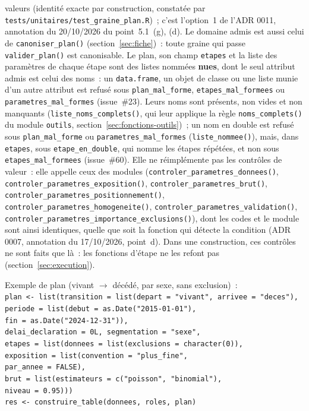\documentclass[a4paper,11pt]{article}
\newcommand{\code}[1]{\texttt{\small #1}}
\begin{document}
{valeurs (identité exacte par construction, constatée par
\code{tests/unitaires/test\_graine\_plan.R})~; c'est l'option~1 de l'ADR
0011, annotation du 20/10/2026 du point~5.1~(g), (d). Le domaine admis est
aussi celui de \code{canoniser\_plan()} (section~\ref{sec:fiche})~: toute
graine qui passe \code{valider\_plan()} est canonisable.
Le plan, son champ \code{etapes} et la liste des paramètres de chaque étape
sont des listes nommées \textbf{nues}, dont le seul attribut admis est
celui des noms~: un \code{data.frame}, un objet de classe ou une liste
munie d'un autre attribut est refusé sous \code{plan\_mal\_forme},
\code{etapes\_mal\_formees} ou \code{parametres\_mal\_formes} (issue~\#23).
Leurs noms sont présents, non vides et non manquants
(\code{liste\_noms\_complets()}, qui leur applique la règle
\code{noms\_complets()} du module \code{outils},
section~\ref{sec:fonctions-outils})~;
un nom en double est refusé sous \code{plan\_mal\_forme} ou
\code{parametres\_mal\_formes} (\code{liste\_nommee()}), mais, dans
\code{etapes}, sous \code{etape\_en\_double}, qui nomme les étapes répétées, et
non sous \code{etapes\_mal\_formees} (issue~\#60).
Elle ne réimplémente pas les contrôles de valeur~: elle appelle ceux des modules
(\code{controler\_parametres\_donnees()}, \code{controler\_parametres\_exposition()},
\code{controler\_parametres\_brut()}, \code{controler\_parametres\_positionnement()},
\code{controler\_parametres\_homogeneite()}, \code{controler\_parametres\_validation()},
\code{controler\_parametres\_importance\_exclusions()}), dont les codes et le module sont ainsi identiques, quelle que soit la
fonction qui détecte la condition (ADR 0007, annotation du 17/10/2026,
point~d). Dans une construction, ces contrôles ne sont faits que là~: les
fonctions d'étape ne les refont pas (section~\ref{sec:execution}).\par}

\begin{encadre}
\small
Exemple de plan (vivant $\to$ décédé, par sexe, sans exclusion)~:\\[2pt]
\code{plan <- list(transition = list(depart = "vivant", arrivee = "deces"),}\\
\code{\phantom{plan <- list(}periode = list(debut = as.Date("2015-01-01"),}\\
\code{\phantom{plan <- list(periode = list(}fin = as.Date("2024-12-31")),}\\
\code{\phantom{plan <- list(}delai\_declaration = 0L, segmentation = "sexe",}\\
\code{\phantom{plan <- list(}etapes = list(donnees = list(exclusions = character(0)),}\\
\code{\phantom{plan <- list(etapes = list(}exposition = list(convention = "plus\_fine",}\\
\code{\phantom{plan <- list(etapes = list(exposition = list(}par\_annee = FALSE),}\\
\code{\phantom{plan <- list(etapes = list(}brut = list(estimateurs = c("poisson", "binomial"),}\\
\code{\phantom{plan <- list(etapes = list(brut = list(}niveau = 0.95)))}\\
\code{res <- construire\_table(donnees, roles, plan)}
\end{encadre}
\end{document}

